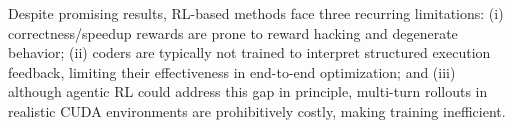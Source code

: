 Despite promising results, RL-based methods face three recurring limitations: (i) correctness/speedup rewards are prone to reward hacking and degenerate behavior; (ii) coders are typically not trained to interpret structured execution feedback, limiting their effectiveness in end-to-end optimization; and (iii) although agentic RL could address this gap in principle, multi-turn rollouts in realistic CUDA environments are prohibitively costly, making training inefficient.






